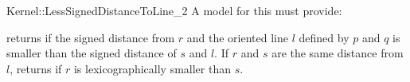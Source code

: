 \begin{ccRefFunctionObjectConcept}{Kernel::LessSignedDistanceToLine_2}
A model for this must provide:


{
returns  if the signed distance from $r$ and the oriented line $l$ 
defined by $p$ and $q$ is smaller than the signed distance of $s$ and $l$.  If
$r$ and $s$ are the same distance from $l$, returns  if $r$ is 
lexicographically smaller than $s$.
}

\ccSeeAlso
{}\\

\end{ccRefFunctionObjectConcept}
